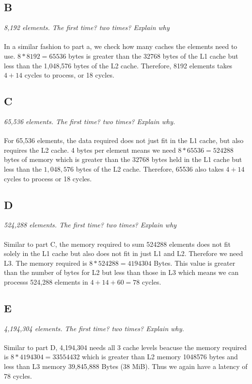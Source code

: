 \documentclass[10pt]{article}
\begin{document}
\subsection{B}
\textit{8,192 elements. The first time? two times? Explain why}
\paragraph{} In a similar fashion to part a, we check how many caches the elements need to use. $8 * 8192 = 65536$ bytes 
is greater than the 32768 bytes of the L1 cache but less than the 1,048,576 bytes of the L2 cache. Therefore, 
8192 elements takes $4 + 14$ cycles to process, or 18 cycles. 
\subsection{C}
\textit{65,536 elements. The first time? two times? Explain why.} 
\paragraph{} For 65,536 elements, the data required does not just fit in the L1 cache, but also requires
the L2 cache. 4 bytes per element means we need $8 * 65536 = 524288$ bytes of memory which is greater than the $32768$ bytes 
held in the L1 cache but less than the $1,048,576$ bytes of the L2 cache. Therefore, 65536 also takes $4 + 14$ cycles to process or 18 cycles. 

\subsection{D}
\textit{524,288 elements. The first time? two times? Explain why} 
\paragraph{} Similar to part C, the memory required to sum 524288 elements does not fit solely in the L1 cache but also does not fit in just L1 and L2. Therefore we need L3. 
The memory required is $8 * 524288 = 4194304$ Bytes. This value is greater than the number of bytes for L2 but less than those in L3 which means we can processs
524,288 elements in $4 + 14 + 60 = 78$ cycles. 

\subsection{E}
\textit{4,194,304 elements. The first time? two times? Explain why.}
\paragraph{} Similar to part D, 4,194,304 needs all 3 cache levels beacuse the memory required is $8 * 4194304 = 33554432$ which is greater than L2 memory 1048576 bytes and less than 
L3 memory 39,845,888 Bytes (38 MiB). Thus we again have a latency of 78 cycles. 
\end{document}

